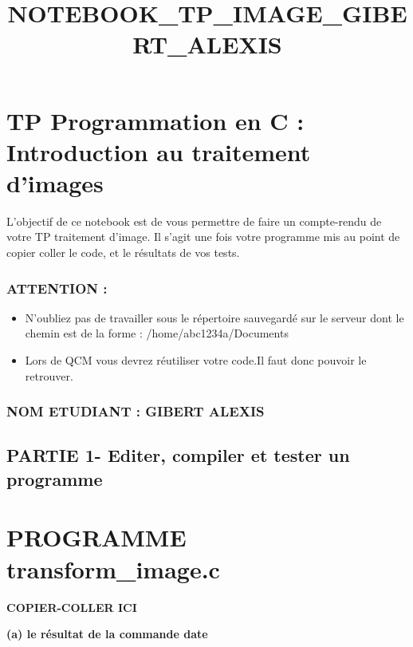 \documentclass[11pt]{article}
\title{NOTEBOOK\_TP\_IMAGE\_GIBERT\_ALEXIS}
\begin{document}
    
    
    \maketitle
    
    

    
    \section{TP Programmation en C : Introduction au traitement
d'images}\label{tp-programmation-en-c-introduction-au-traitement-dimages}

L'objectif de ce notebook est de vous permettre de faire un compte-rendu
de votre TP traitement d'image. Il s'agit une fois votre programme mis
au point de copier coller le code, et le résultats de vos tests.

\subsubsection{ATTENTION :}\label{attention}

\begin{itemize}
\item
  N'oubliez pas de travailler sous le répertoire sauvegardé sur le
  serveur dont le chemin est de la forme : /home/abc1234a/Documents
\item
  Lors de QCM vous devrez réutiliser votre code.Il faut donc pouvoir le
  retrouver.
\end{itemize}

\subsubsection{NOM ETUDIANT : GIBERT
ALEXIS}\label{nom-etudiant-gibert-alexis}

    \subsection{PARTIE 1- Editer, compiler et tester un
programme}\label{partie-1--editer-compiler-et-tester-un-programme}

    \section{PROGRAMME
transform\_image.c}\label{programme-transform_image.c}

\textbf{COPIER-COLLER ICI}

\textbf{(a) le résultat de la commande date}
\end{document}
